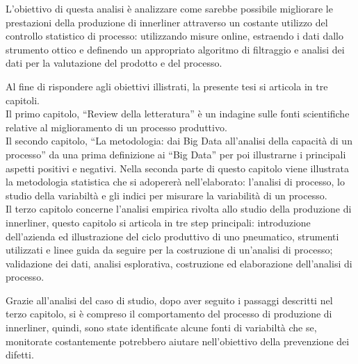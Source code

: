 L'obiettivo di questa analisi è analizzare come sarebbe possibile migliorare le prestazioni della produzione di innerliner attraverso un costante utilizzo del controllo statistico di processo: utilizzando misure online, estraendo i dati dallo strumento ottico e definendo un appropriato algoritmo di filtraggio e analisi dei dati per la valutazione del prodotto e del processo.

Al fine di rispondere agli obiettivi illistrati, la presente tesi si articola in tre capitoli. \\
Il primo capitolo, ``Review della letteratura'' è un indagine sulle fonti scientifiche relative al miglioramento di un processo produttivo. \\
Il secondo capitolo, ``La metodologia: dai Big Data all'analisi della capacità di un processo'' da una prima definizione ai ``Big Data'' per poi illustrarne i principali aspetti positivi e negativi. Nella seconda parte di questo capitolo viene illustrata la metodologia statistica che si adopererà nell'elaborato: l'analisi di processo, lo studio della variabiltà e gli indici per misurare la variabilità di un processo. \\
Il terzo capitolo concerne l'analisi empirica rivolta allo studio della produzione di innerliner, questo capitolo si articola in tre step principali: introduzione dell'azienda ed illustrazione del ciclo produttivo di uno pneumatico, strumenti utilizzati e linee guida da seguire per la costruzione di un'analisi di processo; validazione dei dati, analisi esplorativa, costruzione ed elaborazione dell'analisi di processo.

Grazie all’analisi del caso di studio, dopo aver seguito i passaggi descritti nel terzo capitolo, si è compreso il comportamento del processo di produzione di innerliner, quindi, sono state identificate alcune fonti di variabiltà che se, monitorate costantemente potrebbero aiutare nell'obiettivo della prevenzione dei difetti. 

